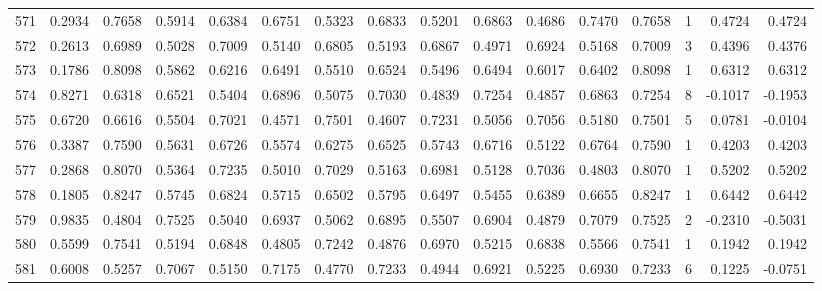 \begin{tabular}{lrrrrrrrrrrrrrrr}
571 &      0.2934 &  0.7658 &  0.5914 &  0.6384 &  0.6751 &  0.5323 &  0.6833 &  0.5201 &  0.6863 &  0.4686 &   0.7470 &     0.7658 &      1 &                    0.4724 &                     0.4724 \\
572 &      0.2613 &  0.6989 &  0.5028 &  0.7009 &  0.5140 &  0.6805 &  0.5193 &  0.6867 &  0.4971 &  0.6924 &   0.5168 &     0.7009 &      3 &                    0.4396 &                     0.4376 \\
573 &      0.1786 &  0.8098 &  0.5862 &  0.6216 &  0.6491 &  0.5510 &  0.6524 &  0.5496 &  0.6494 &  0.6017 &   0.6402 &     0.8098 &      1 &                    0.6312 &                     0.6312 \\
574 &      0.8271 &  0.6318 &  0.6521 &  0.5404 &  0.6896 &  0.5075 &  0.7030 &  0.4839 &  0.7254 &  0.4857 &   0.6863 &     0.7254 &      8 &                   -0.1017 &                    -0.1953 \\
575 &      0.6720 &  0.6616 &  0.5504 &  0.7021 &  0.4571 &  0.7501 &  0.4607 &  0.7231 &  0.5056 &  0.7056 &   0.5180 &     0.7501 &      5 &                    0.0781 &                    -0.0104 \\
576 &      0.3387 &  0.7590 &  0.5631 &  0.6726 &  0.5574 &  0.6275 &  0.6525 &  0.5743 &  0.6716 &  0.5122 &   0.6764 &     0.7590 &      1 &                    0.4203 &                     0.4203 \\
577 &      0.2868 &  0.8070 &  0.5364 &  0.7235 &  0.5010 &  0.7029 &  0.5163 &  0.6981 &  0.5128 &  0.7036 &   0.4803 &     0.8070 &      1 &                    0.5202 &                     0.5202 \\
578 &      0.1805 &  0.8247 &  0.5745 &  0.6824 &  0.5715 &  0.6502 &  0.5795 &  0.6497 &  0.5455 &  0.6389 &   0.6655 &     0.8247 &      1 &                    0.6442 &                     0.6442 \\
579 &      0.9835 &  0.4804 &  0.7525 &  0.5040 &  0.6937 &  0.5062 &  0.6895 &  0.5507 &  0.6904 &  0.4879 &   0.7079 &     0.7525 &      2 &                   -0.2310 &                    -0.5031 \\
580 &      0.5599 &  0.7541 &  0.5194 &  0.6848 &  0.4805 &  0.7242 &  0.4876 &  0.6970 &  0.5215 &  0.6838 &   0.5566 &     0.7541 &      1 &                    0.1942 &                     0.1942 \\
581 &      0.6008 &  0.5257 &  0.7067 &  0.5150 &  0.7175 &  0.4770 &  0.7233 &  0.4944 &  0.6921 &  0.5225 &   0.6930 &     0.7233 &      6 &                    0.1225 &                    -0.0751 \\

\end{tabular}

